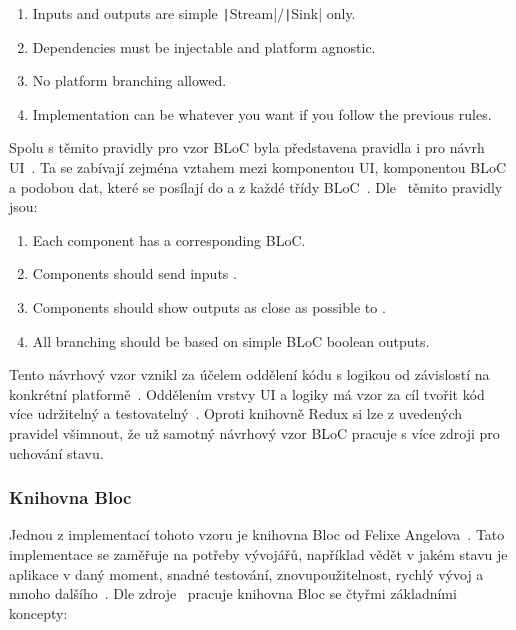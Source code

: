 \begin{enumerate}
    \item Inputs and outputs are simple
    \texttt|Stream|/\texttt|Sink| only.
    \item Dependencies must be injectable and platform agnostic.
    \item No platform branching allowed.
    \item Implementation can be whatever you want
    if you follow the previous rules.
\end{enumerate}

Spolu s těmito pravidly pro vzor BLoC byla představena
pravidla i pro návrh UI~\cite{googledevelopers_bloc}.
Ta se zabívají zejména vztahem mezi komponentou UI, komponentou BLoC
a podobou dat,
které se posílají do a z každé třídy BLoC~\cite{googledevelopers_bloc}.
Dle~\cite{googledevelopers_bloc} těmito pravidly jsou:

\begin{enumerate}
    \item Each  component has a corresponding BLoC.
    \item Components should send inputs .
    \item Components should show outputs as close as possible to .
    \item All branching should be based on simple BLoC boolean outputs.
\end{enumerate}

Tento návrhový vzor vznikl za účelem oddělení kódu s logikou
od závislostí na konkrétní platformě~\cite{googledevelopers_bloc}.
Oddělením vrstvy UI a logiky má vzor za cíl tvořit kód více udržitelný a
testovatelný~\cite{flutterando_analyzing_bloc_mobx}.
Oproti knihovně Redux si lze z uvedených pravidel všimnout,
že už samotný návrhový vzor BLoC pracuje s více zdroji pro uchování stavu.

\subsubsection{Knihovna Bloc}

Jednou z implementací tohoto vzoru je knihovna Bloc od Felixe
Angelova~\cite{bloclibrary_whybloc}.
Tato implementace se zaměřuje na potřeby vývojářů,
například vědět v jakém stavu je aplikace v daný moment, snadné testování,
znovupoužitelnost, rychlý vývoj a mnoho dalšího~\cite{bloclibrary_whybloc}. 
Dle zdroje~\cite{bloclibrary_coreconcepts} pracuje knihovna Bloc se čtyřmi
základními koncepty: 

